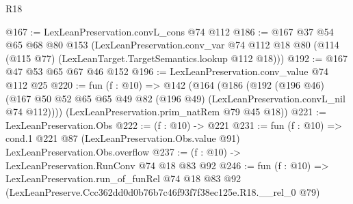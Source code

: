 \begin{lexlean}{R18}
\begin{coremodule}
@167 := LexLeanPreservation.convL_cons @74 @112
@186 := @167
    @37
    @54
    @65
    @68
    @80
    @153
    (LexLeanPreservation.conv_var
      @74
      @112
      @18
      @80
      (@114 (@115 @77) (LexLeanTarget.TargetSemantics.lookup @112 @18)))
@192 := @167 @47 @53 @65 @67 @46 @152
@196 := LexLeanPreservation.conv_value @74 @112 @25
@220 := fun (f : @10) =>
  @142
    (@164
      (@186
        (@192
          (@196 @46)
          (@167 @50 @52 @65 @65 @49 @82 (@196 @49) (LexLeanPreservation.convL_nil @74 @112))))
      (LexLeanPreservation.prim_natRem @79 @45 @18))
@221 := LexLeanPreservation.Obs
@222 := (f : @10) -> @221
@231 := fun (f : @10) =>
  cond.{1} @221 @87 (LexLeanPreservation.Obs.value @91) LexLeanPreservation.Obs.overflow
@237 := (f : @10) -> LexLeanPreservation.RunConv @74 @18 @83 @92
@246 := fun (f : @10) =>
  LexLeanPreservation.run_of_funRel
    @74
    @18
    @83
    @92
    (LexLeanPreserve.Ccc362dd0d0b76b7c46f93f7f38ec125e.R18.__rel_0 @79)
\end{coremodule}
\end{lexlean}
